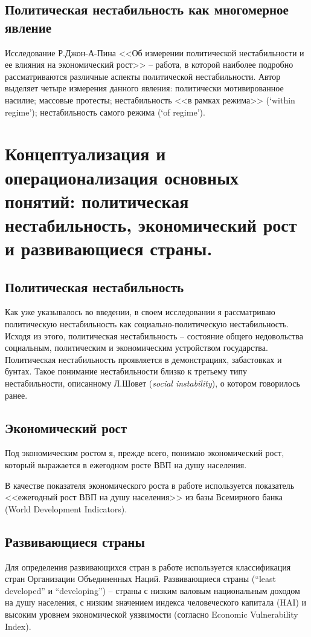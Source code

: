 \documentclass[14pt]{extarticle} %
\begin{document}
\subsection{Политическая нестабильность как многомерное явление}
Исследование Р.Джон-А-Пина <<Об измерении политической нестабильности и ее влияния на экономический рост>> -- работа, в которой наиболее подробно рассматриваются различные аспекты политической нестабильности. Автор выделяет четыре измерения данного явления: политически мотивированное насилие; массовые протесты; нестабильность <<в рамках режима>> (‘within regime’); нестабильность самого режима (‘of regime’). 
\section{Концептуализация и операционализация основных понятий: политическая нестабильность, экономический рост и развивающиеся страны.}
\subsection{Политическая нестабильность}
Как уже указывалось во введении, в своем исследовании я рассматриваю политическую нестабильность как социально-политическую нестабильность. Исходя из этого, политическая нестабильность  – состояние общего недовольства социальным, политическим и экономическим устройством государства. Политическая нестабильность проявляется в демонстрациях, забастовках и бунтах. Такое понимание нестабильности близко к третьему типу нестабильности, описанному Л.Шовет (\textit{social instability}), о котором говорилось ранее. 
\subsection{Экономический рост}
Под экономическим ростом я, прежде всего, понимаю экономический рост, который выражается в ежегодном росте ВВП на душу населения. 

В качестве показателя экономического роста в работе используется показатель <<ежегодный рост ВВП на душу населения>> из базы Всемирного банка (World Development Indicators).
\subsection{Развивающиеся страны}
Для определения развивающихся стран в работе используется классификация стран Организации Объединенных Наций. Развивающиеся страны (“least developed” и “developing”) – страны с низким валовым национальным доходом на душу населения, с низким значением индекса человеческого капитала (HAI) и высоким уровнем экономической уязвимости (согласно Economic Vulnerability Index).
\end{document}
